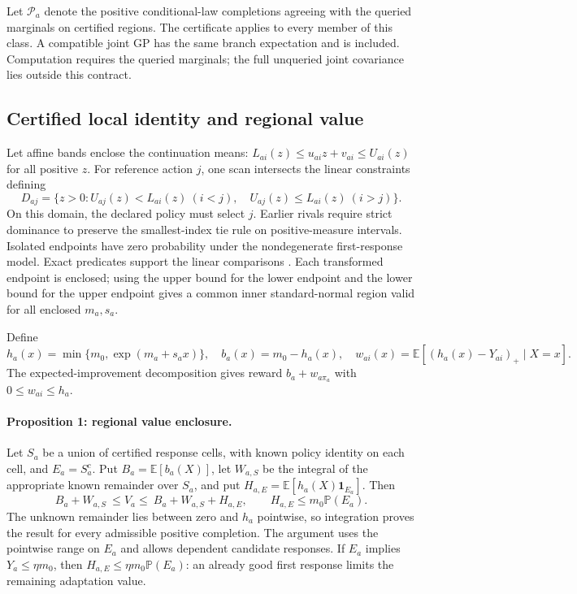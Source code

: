 Let $\mathcal P_a$ denote the positive conditional-law completions agreeing with the queried marginals on certified regions. The certificate applies to every member of this class. A compatible joint GP has the same branch expectation and is included. Computation requires the queried marginals; the full unqueried joint covariance lies outside this contract.

\subsection{Certified local identity and regional value}

Let affine bands enclose the continuation means: $L_{ai}(z)\le u_{ai}z+v_{ai}\le U_{ai}(z)$ for all positive $z$. For reference action $j$, one scan intersects the linear constraints defining
\begin{equation}
D_{aj}=\{z>0: U_{aj}(z)<L_{ai}(z)\ (i<j),\quad
                  U_{aj}(z)\le L_{ai}(z)\ (i>j)\}.
\label{eq:final_stability}
\end{equation}
On this domain, the declared policy must select $j$. Earlier rivals require strict dominance to preserve the smallest-index tie rule on positive-measure intervals. Isolated endpoints have zero probability under the nondegenerate first-response model. Exact predicates support the linear comparisons \citep{ref41}. Each transformed endpoint is enclosed; using the upper bound for the lower endpoint and the lower bound for the upper endpoint gives a common inner standard-normal region valid for all enclosed $m_a,s_a$.

Define
\begin{equation}
h_a(x)=\min\{m_0,\exp(m_a+s_ax)\},\quad b_a(x)=m_0-h_a(x),
\quad w_{ai}(x)=\mathbb E[(h_a(x)-Y_{ai})_+\mid X=x].
\label{eq:final_remainder}
\end{equation}
The expected-improvement decomposition gives reward $b_a+w_{a\pi_a}$ with $0\le w_{ai}\le h_a$.

\paragraph{Proposition 1: regional value enclosure.}
Let $S_a$ be a union of certified response cells, with known policy identity on each cell, and $E_a=S_a^c$. Put $B_a=\mathbb E[b_a(X)]$, let $W_{a,S}$ be the integral of the appropriate known remainder over $S_a$, and put $H_{a,E}=\mathbb E[h_a(X)\mathbf1_{E_a}]$. Then
\begin{equation}
B_a+W_{a,S}\ \le V_a\le\ B_a+W_{a,S}+H_{a,E},
\qquad H_{a,E}\le m_0\mathbb P(E_a).
\label{eq:final_regional_enclosure}
\end{equation}
The unknown remainder lies between zero and $h_a$ pointwise, so integration proves the result for every admissible positive completion. The argument uses the pointwise range on $E_a$ and allows dependent candidate responses. If $E_a$ implies $Y_a\le\eta m_0$, then $H_{a,E}\le\eta m_0\mathbb P(E_a)$: an already good first response limits the remaining adaptation value.

